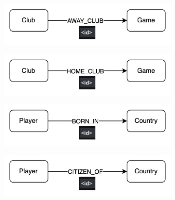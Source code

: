 \documentclass{Configuration_Files/PoliMi3i_thesis}
\begin{document}
\begin{figure}[H]
  \centering
  \begin{subfigure}[b]{0.45\linewidth}
    \includegraphics[width=\linewidth]{Project Template/Images/relationships/awayclub.png}
  \end{subfigure}
  \hfill
  \begin{subfigure}[b]{0.45\linewidth}
    \includegraphics[width=\linewidth]{Project Template/Images/relationships/homeclub.png}
  \end{subfigure}

  \vspace{1em}

  \begin{subfigure}[b]{0.45\linewidth}
    \includegraphics[width=\linewidth]{Project Template/Images/relationships/bornin.png}
  \end{subfigure}
  \hfill
  \begin{subfigure}[b]{0.45\linewidth}
    \includegraphics[width=\linewidth]{Project Template/Images/relationships/citizenof.png}
  \end{subfigure}
  

\end{figure}
\end{document}
